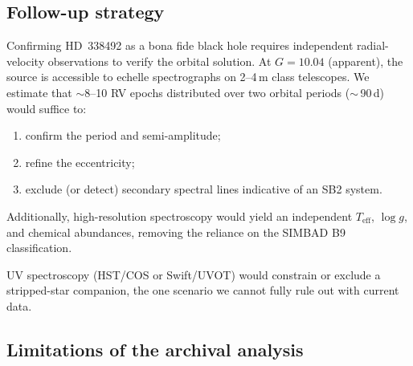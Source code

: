 \documentclass[usenatbib,fleqn]{mnras}
\begin{document}
\subsection{Follow-up strategy}
\label{sec:followup}

Confirming HD~338492 as a bona fide black hole requires independent
radial-velocity observations to verify the orbital solution.  At
$G = 10.04$ (apparent), the source is accessible to echelle
spectrographs on 2--4\,m class telescopes.  We estimate that
$\sim$8--10 RV epochs distributed over two orbital periods
($\sim$\,90\,d) would suffice to:
\begin{enumerate}
\item confirm the period and semi-amplitude;
\item refine the eccentricity;
\item exclude (or detect) secondary spectral lines indicative of
  an SB2 system.
\end{enumerate}
Additionally, high-resolution spectroscopy would yield an
independent $T_\mathrm{eff}$, $\log g$, and chemical abundances,
removing the reliance on the SIMBAD B9 classification.

UV spectroscopy (HST/COS or Swift/UVOT) would constrain or exclude
a stripped-star companion, the one scenario we cannot fully rule out
with current data.

\subsection{Limitations of the archival analysis}
\label{sec:limitations}
\end{document}
